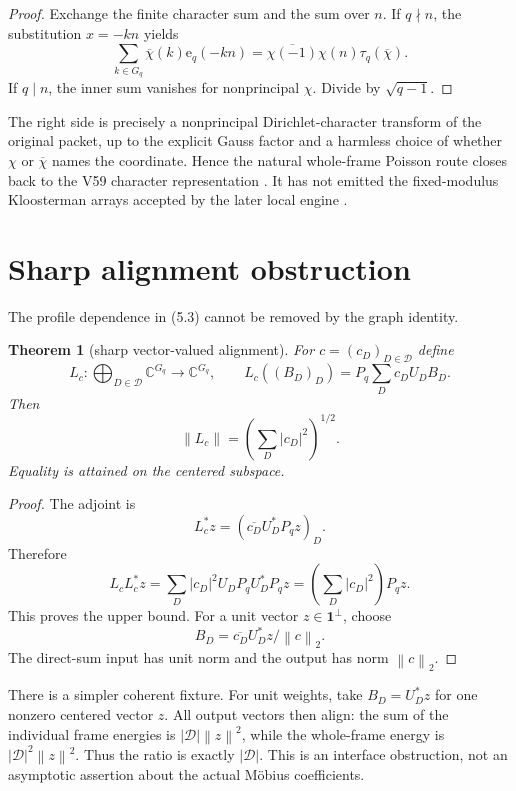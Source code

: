 \documentclass[11pt]{article}
\newtheorem{theorem}{Theorem}[section]
\newcommand{\C}{\mathbb C}
\newcommand{\e}{\mathrm e}
\newcommand{\one}{\mathbf 1}
\newcommand{\Gq}{G_q}
\newcommand{\norm}[1]{\left\lVert #1\right\rVert}
\begin{document}
\begin{proof}
Exchange the finite character sum and the sum over $n$.  If $q\nmid n$,
the substitution $x=-kn$ yields
\[
 \sum_{k\in\Gq}\overline\chi(k)\e_q(-kn)
 =\overline{\chi(-1)}\chi(n)\tau_q(\overline\chi).
\]
If $q\mid n$, the inner sum vanishes for nonprincipal $\chi$.  Divide by
$\sqrt{q-1}$.
\end{proof}

The right side is precisely a nonprincipal Dirichlet-character transform of
the original packet, up to the explicit Gauss factor and a harmless choice of
whether $\chi$ or $\overline\chi$ names the coordinate.  Hence the natural
whole-frame Poisson route closes back to the V59 character representation
\cite{Wang2026V59}.  It has not emitted the fixed-modulus Kloosterman arrays
accepted by the later local engine \cite{BlomerPascadi2026}.

\section{Sharp alignment obstruction}

The profile dependence in (5.3) cannot be removed by the graph identity.

\begin{theorem}[sharp vector-valued alignment]
\label{thm:alignment}
For $c=(c_D)_{D\in\mathcal D}$ define
\[
 L_c:\bigoplus_{D\in\mathcal D}\C^{\Gq}\to\C^{\Gq},
 \qquad L_c((B_D)_D)=P_q\sum_Dc_DU_DB_D.
 \tag{7.1}
\]
Then
\[
 \boxed{\norm{L_c}=\left(\sum_D|c_D|^2\right)^{1/2}.}
 \tag{7.2}
\]
Equality is attained on the centered subspace.
\end{theorem}

\begin{proof}
The adjoint is
\[
 L_c^*z=(\overline{c_D}U_D^*P_qz)_D.
\]
Therefore
\[
 L_cL_c^*z=\sum_D|c_D|^2U_DP_qU_D^*P_qz
 =\left(\sum_D|c_D|^2\right)P_qz.
\]
This proves the upper bound.  For a unit vector $z\in\one^\perp$, choose
\[
 B_D=\overline{c_D}U_D^*z/\norm{c}_2.
\]
The direct-sum input has unit norm and the output has norm $\norm{c}_2$.
\end{proof}

There is a simpler coherent fixture.  For unit weights, take
$B_D=U_D^*z$ for one nonzero centered vector $z$.  All output vectors then
align: the sum of the individual frame energies is
$|\mathcal D|\norm{z}^2$, while the whole-frame energy is
$|\mathcal D|^2\norm{z}^2$.  Thus the ratio is exactly $|\mathcal D|$.
This is an interface obstruction, not an asymptotic assertion about the
actual Möbius coefficients.
\end{document}
